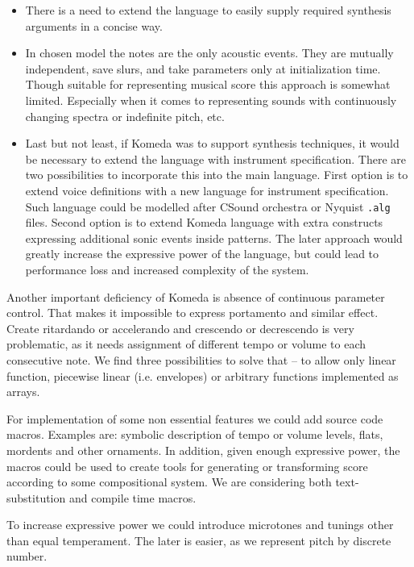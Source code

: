 \documentclass{article}
\begin{document}
\begin{itemize}
    \setlength{\itemsep}{0pt}
  \item There is a need to extend the language to easily supply required
    synthesis arguments in a concise way.

  \item In chosen model the notes are the only acoustic events. They are
    mutually independent, save slurs, and take parameters only at
    initialization time. Though suitable for representing musical score this
    approach is somewhat limited. Especially when it comes to representing
    sounds with continuously changing spectra or indefinite pitch, etc. 	

  \item Last but not least, if Komeda was to support synthesis techniques, it
    would be necessary to extend the language with instrument specification.
    There are two possibilities to incorporate this into the main language.
    First option is to extend voice definitions with a new language for
    instrument specification. Such language could be modelled after CSound
    orchestra \cite{csound} or Nyquist {\tt .alg} \cite{alg} files. Second
    option is to extend Komeda language with extra constructs expressing
    additional sonic events inside patterns. The later approach would greatly
    increase the expressive power of the language, but could lead to
    performance loss and increased complexity of the system. 
\end{itemize}

Another important deficiency of Komeda is absence of continuous parameter
control. That makes it impossible to express portamento and similar effect.
Create ritardando or accelerando and crescendo or decrescendo is very
problematic, as it needs assignment of different tempo or volume to each
consecutive note. We find three possibilities to solve that -- to allow only
linear function, piecewise linear (i.e. envelopes) or arbitrary functions
implemented as arrays.

For implementation of some non essential features we could add source code
macros.  Examples are: symbolic description of tempo or volume levels, flats,
mordents and other ornaments.  In addition, given enough expressive power, the
macros could be used to create tools for generating or transforming score
according to some compositional system. We are considering both
text-substitution and compile time macros.

To increase expressive power we could introduce microtones and tunings other
than equal temperament.  The later is easier, as we represent pitch by discrete
number.
\end{document}
